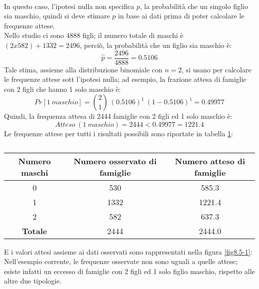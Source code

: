 \documentclass[drafts, 10pt]{book}
\newcounter{example}[section]
\begin{document}
\begin{example}
    \\
    In questo caso, l'ipotesi nulla non specifica $p$, la probabilità che un singolo figlio sia maschio, quindi si deve stimare $p$ in base ai dati prima di poter calcolare le frequenze attese.
    \\
    Nello studio ci sono 4888 figli; il numero totale di maschi è $(2 x 582) + 1332 = 2496$, perciò, la probabilità che un figlio sia maschio è:
    \begin{equation}
    \hat{p} = \frac{2496}{4888} = 0.5106
    \end{equation}
    Tale stima, assieme alla distribuzione binomiale con $n = 2$, si usano per calcolare le frequenze attese sott l'ipotesi nulla; ad esempio, la frazione attesa di famiglie con 2 figli che hanno 1 solo maschio è:
    \begin{equation}
    Pr[1\ maschio] = \binom{2}{1}\ (0.5106)^1\ (1-0.5106)^1 = 0.49977
    \end{equation}
    Quindi, la frequenza attesa di 2444 famiglie con 2 figli ed 1 solo maschio è:
    \begin{equation}
    Atteso\ (1\ maschio) = 2444 < 0.49977 = 1221.4
    \end{equation}
    Le frequenze attese per tutti i risultati possibili sono riportate in tabella \ref{tabmaschi2}:
    \begin{table}[H]
        \centering
        \renewcommand\arraystretch{1.2}
        \begin{tabular}{c|c|c}
        \hline
        \textbf{Numero maschi} & \textbf{Numero osservato di famiglie} & \textbf{Numero atteso di famiglie}\\
        \hline
        0 & 530 & 585.3\\
        1 & 1332 & 1221.4\\
        2 & 582 & 637.3\\
        \hline
        \textbf{Totale} & 2444 & 2444.0\\
        \hline
        \end{tabular}
        \caption{}
        \label{tabmaschi2}
    \end{table}\noindent
    E i valori attesi assieme ai dati osservati sono rappresentati nella figura \ref{fig8.5-1}:
    Nell'esempio corrente, le frequenze osservate non sono uguali a quelle attese; esiste infatti un eccesso di famiglie con 2 figli ed 1 solo figlio maschio, rispetto alle altre due tipologie.

\end{example}
\end{document}
